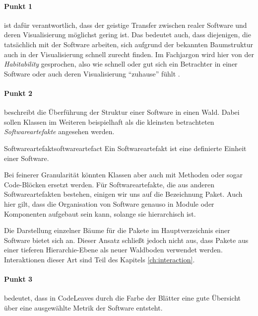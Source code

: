 
\paragraph{Punkt 1} ist dafür verantwortlich, dass der geistige Transfer zwischen realer Software und deren Visualisierung möglichst gering ist. Das bedeutet auch, dass diejenigen, die tatsächlich mit der Software arbeiten, sich aufgrund der bekannten Baumstruktur auch in der Visualisierung schnell zurecht finden. Im Fachjargon wird hier von der \emph{Habitability} gesprochen, also wie schnell oder gut sich ein Betrachter in einer Software oder auch deren Visualisierung "`zuhause"' fühlt \cite{wettel2007program}.

\paragraph{Punkt 2} beschreibt die Überführung der Struktur einer Software in einen Wald. Dabei sollen Klassen im Weiteren beispielhaft als die kleinsten betrachteten \textit{Softwareartefakte} angesehen werden.

\begin{defbox}{Softwareartefakt}{softwareartefact}
  Ein Softwareartefakt ist eine definierte Einheit einer Software.
\end{defbox}

Bei feinerer Granularität könnten Klassen aber auch mit Methoden oder sogar Code-Blöcken ersetzt werden. Für Softwareartefakte, die aus anderen Softwareartefakten bestehen, einigen wir uns auf die Bezeichnung Paket. Auch hier gilt, dass die Organisation von Software genauso in Module oder Komponenten aufgebaut sein kann, solange sie hierarchisch ist.

Die Darstellung einzelner Bäume für die Pakete im Hauptverzeichnis einer Software bietet sich an. Dieser Ansatz schließt jedoch nicht aus, dass Pakete aus einer tieferen Hierarchie-Ebene als neuer Waldboden verwendet werden. Interaktionen dieser Art sind Teil des Kapitels \ref{ch:interaction}.

\paragraph{Punkt 3} bedeutet, dass in CodeLeaves durch die Farbe der Blätter eine gute Übersicht über eine ausgewählte Metrik der Software entsteht.


